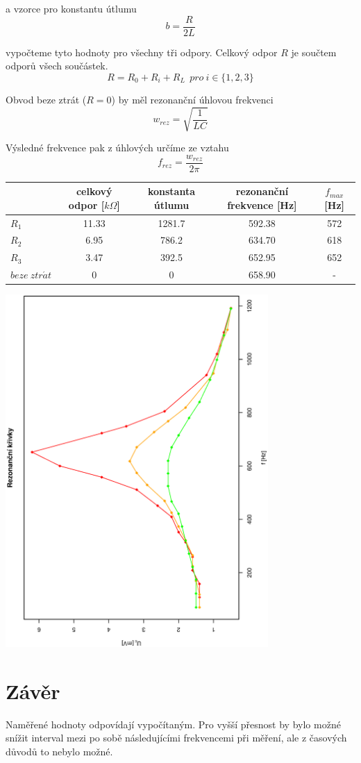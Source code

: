 \documentclass[10pt]{article}
\begin{document}
\noindent
a vzorce pro konstantu útlumu
\begin{equation}
b = \frac{R}{2L}
\end{equation}

\noindent
vypočteme tyto hodnoty pro všechny tři odpory. Celkový odpor $R$ je součtem
odporů všech součástek. \\
\begin{equation}
R = R_0 + R_i + R_L~~ pro~i \in \{1, 2, 3\}
\end{equation}

\noindent
Obvod beze ztrát ($R = 0$) by měl rezonanční úhlovou frekvenci 
\begin{equation}
w_{rez} = \sqrt{\frac{1}{LC}}
\end{equation}

\noindent
Výsledné frekvence pak z úhlových určíme ze vztahu
\begin{equation}
f_{rez} = \frac{w_{rez}}{2 \pi}
\end{equation}


\begin{tabular}[b]{|l|c|c|c|c|}
\hline
& celkový odpor [$k \Omega$] & konstanta útlumu & rezonanční frekvence [Hz] & 
                   $f_{max}$ [Hz] \\
\hline
$R_1$ & 11.33 & 1281.7 & 592.38 & 572 \\
$R_2$ & 6.95  & 786.2  & 634.70 & 618 \\
$R_3$ & 3.47  & 392.5  & 652.95 & 652 \\
$beze~ztr\acute{a}t$  & 0 & 0 & 658.90 & - \\
\hline
\end{tabular}

\vspace{1cm}

\includegraphics[width=10cm,angle=270]{graf.eps}

\section{Závěr} 
Naměřené hodnoty odpovídají vypočítaným. Pro vyšší přesnost by
bylo možné snížit interval mezi po sobě následujícími frekvencemi při měření,
ale z časových důvodů to nebylo možné.
\end{document}
